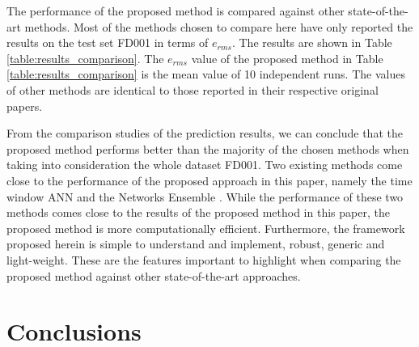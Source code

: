 \documentclass[preprint,12pt]{elsarticle}%
\begin{document}



The performance of the proposed method is compared against
other state-of-the-art methods. Most of the methods chosen to compare here 
have only reported the results on the test set FD001 in terms of
$e_{rms}$. The results are shown in Table \ref{table:results_comparison}. The
$e_{rms}$ value of the proposed method in Table \ref{table:results_comparison}
is the mean value of 10 independent runs. The values of other methods are
identical to those reported in their respective original papers.

From the comparison studies of the prediction results, we can conclude that
the proposed method performs better than the majority of the chosen methods
when taking into consideration the whole dataset FD001. Two existing methods
come close to the performance of the proposed approach in this paper, namely
the time window ANN \cite{Lim2016} and the Networks Ensemble \cite{Zhang2016}.
While the performance of these two methods comes close to the results of the
proposed method in this paper, the proposed method is more computationally
efficient. Furthermore, the framework proposed herein is simple to understand
and implement, robust, generic and light-weight. These are the features 
important to highlight when comparing the proposed method against other
state-of-the-art approaches.

\section{Conclusions}
\end{document}
